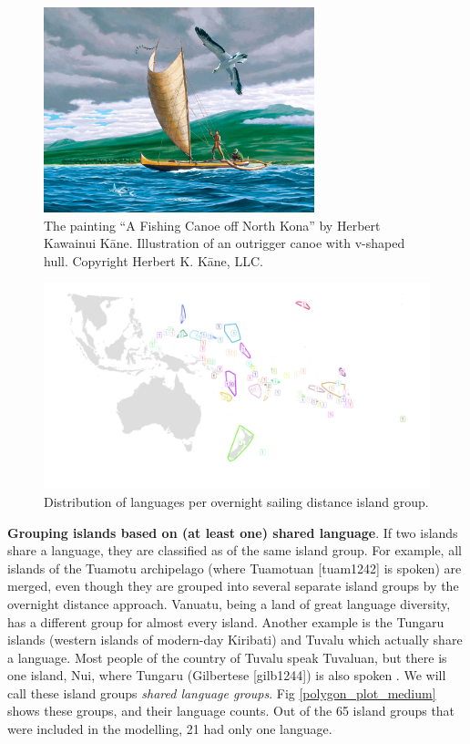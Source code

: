 \documentclass[unnumsec,webpdf,modern,medium]{oup-authoring-template}
\begin{document}
\begin{appendices}
\begin{figure}[ht]
\centering
\includegraphics[width=0.7\textwidth]{Herb-Kane_Fishing-Canoe-off-North-Kona.jpg}
\caption{{The painting ``A Fishing Canoe off North Kona'' by Herbert Kawainui K{\=a}ne. Illustration of an outrigger canoe with v-shaped hull. Copyright Herbert K. K{\=a}ne, LLC.}}
\label{kane_fishing_canoe}
\end{figure}

\begin{figure}
\centering
\includegraphics[width=\textwidth]{polygon_SBZR_group_map.png}
\caption{{Distribution of languages per overnight sailing distance island group.}}
\label{polygon_plot_SBZR}
\end{figure}

\textbf{Grouping islands based on (at least one) shared language}. If two islands share a language, they are classified as of the same island group. For example, all islands of the Tuamotu archipelago (where Tuamotuan [tuam1242] is spoken) are merged, even though they are grouped into several separate island groups by the overnight distance approach. Vanuatu, being a land of great language diversity, has a different group for almost every island. Another example is the Tungaru islands (western islands of modern-day Kiribati) and Tuvalu which actually share a language. Most people of the country of Tuvalu speak Tuvaluan, but there is one island, Nui, where Tungaru (Gilbertese [gilb1244]) is also spoken \citep{faaniu1983tuvalu, macdonald_2020, omniglot_tuvaluan}. We will call these island groups \textit{shared language groups}. Fig \ref{polygon_plot_medium} shows these groups, and their language counts. Out of the 65 island groups that were included in the modelling, 21 had only one language.


\end{appendices}
\end{document}
